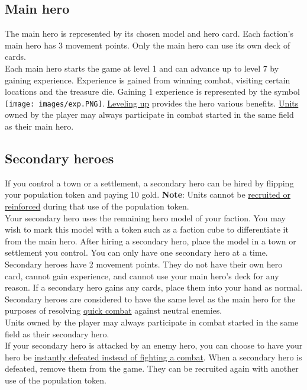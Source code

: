 \documentclass[12pt]{article}
\begin{document}
\subsection*{Main hero}
The main hero is represented by its chosen model and hero card. Each faction’s main hero has 3 movement points. Only the main hero can use its own deck of cards.\\[6pt]
Each main hero starts the game at level 1 and can advance up to level 7 by gaining experience. Experience is gained from winning combat, visiting certain locations and the treasure die. Gaining 1 experience is represented by the symbol \texttt{[image: images/exp.PNG]}. \hyperlink{Level}{Leveling up} provides the hero various benefits. \hyperlink{Units}{Units} owned by the player may always participate in combat started in the same field as their main hero.
\subsection*{\hypertarget{Secondary}{Secondary heroes}}
If you control a town or a settlement, a secondary hero can be hired by flipping your population token and paying 10 gold. \textbf{Note}: Units cannot be \hyperlink{Units}{recruited or reinforced} during that use of the population token.\\[6pt]
Your secondary hero uses the remaining hero model of your faction. You may wish to mark this model with a token such as a faction cube to differentiate it from the main hero. After hiring a secondary hero, place the model in a town or settlement you control. You can only have one secondary hero at a time.\\[6pt]
Secondary heroes have 2 movement points. They do not have their own hero card, cannot gain experience, and cannot use your main hero's deck for any reason. If a secondary hero gains any cards, place them into your hand as normal.
Secondary heroes are considered to have the same level as the main hero for the purposes of resolving \hyperlink{Quick}{quick combat} against neutral enemies.\\[6pt]
Units owned by the player may always participate in combat started in the same field as their secondary hero.\\[6pt]
If your secondary hero is attacked by an enemy hero, you can choose to have your hero be \hyperlink{Endcombat}{instantly defeated instead of fighting a combat}. When a secondary hero is defeated, remove them from the game. They can be recruited again with another use of the population token.\\[6pt]
\end{document}
